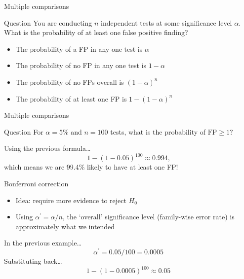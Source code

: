 \begin{frame}{Multiple comparisons}
    \begin{block}{Question}
        You are conducting $n$ independent tests at some significance level
        $\alpha$. \\
        What is the probability of at least one false positive finding?
    \end{block}
    \begin{itemize}[<+->]
        \item The probability of a FP in any one test is $\alpha$
        \item The probability of \alert{no} FP in any one test is $1 - \alpha$
        \item The probability of \alert{no} FPs overall is
              $\left( 1 - \alpha \right)^{n}$
        \item The probability of \alert{at least one} FP is
              $1 - \left( 1 - \alpha \right)^{n}$
    \end{itemize}
\end{frame}

\begin{frame}{Multiple comparisons}
    \begin{block}{Question}
        For $\alpha = 5\%$ and $n = 100$ tests, what is the probability of
        $\text{FP} \geq 1$?
    \end{block}
    \vfill\pause
    Using the previous formula\ldots
    \[
        1 - \left( 1 - 0.05 \right)^{100} \approx 0.994 \text{,}
    \]
    which means we are \alert{99.4\% likely to have at least one FP}!
\end{frame}

\begin{frame}{Bonferroni correction}
    \begin{itemize}
        \item Idea: require more evidence to reject $H_{0}$
        \item Using $\alpha^{\prime} = \alpha / n$, the `overall' significance
              level (\alert{family\hyp{}wise error rate}) is approximately
              what we intended
    \end{itemize}
    \vfill
    In the previous example\ldots
    \[
        \alpha^{\prime} = 0.05 / 100 = 0.0005
    \]
    Substituting back\ldots
    \[
        1 - \left( 1 - 0.0005 \right)^{100} \approx 0.05
    \]
\end{frame}



